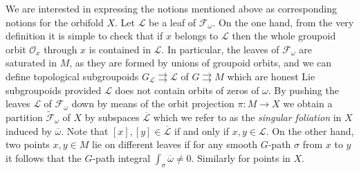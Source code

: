 \documentclass[
  a4paper, 
  reqno, 
  oneside, 
  12pt
]{amsart}
\theoremstyle{definition}
\theoremstyle{remark}
\newcommand{\rr}{\rightrightarrows}
\begin{document}
We are interested in expressing the notions mentioned above as corresponding notions for the orbifold $X$. Let $\mathcal{L}$ be a leaf of $\mathcal{F}_\omega$. On the one hand, from the very definition it is simple to check that if $x$ belongs to $\mathcal{L}$ then the whole groupoid orbit $\mathcal{O}_x$ through $x$ is contained in $\mathcal{L}$. In particular, the leaves of $\mathcal{F}_\omega$ are saturated in $M$, as they are formed by unions of groupoid orbits, and we can define topological subgroupoids $G_\mathcal{L}\rr \mathcal{L}$ of $G\rr M$ which are honest Lie subgroupoids provided $\mathcal{L}$ does not contain orbits of zeros of $\omega$. By pushing the leaves $\mathcal{L}$ of $\mathcal{F}_\omega$ down by means of the orbit projection $\pi:M\to X$ we obtain a partition $\tilde{\mathcal{F}}_\omega$ of $X$ by subspaces $\overline{\mathcal{L}}$ which we refer to as the \emph{singular foliation} in $X$ induced by $\overline{\omega}$. Note that $[x],[y]\in \overline{\mathcal{L}}$ if and only if $x,y\in \mathcal{L}$. On the other hand, two points $x,y\in M$ lie on different leaves if for any smooth $G$-path $\sigma$ from $x$ to $y$ it follows that the $G$-path integral $\int_{\sigma}\overline{\omega}\neq 0$. Similarly for points in $X$.
\end{document}
